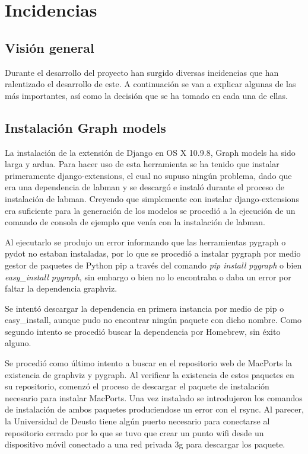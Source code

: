 \chapter{Incidencias}

\section{Visión general}

Durante el desarrollo del proyecto han surgido diversas incidencias que han ralentizado el desarrollo de este. A continuación se van a explicar algunas de las más importantes, así como la decisión que se ha tomado en cada una de ellas.

\section{Instalación Graph models}

La instalación de la extensión de Django en OS X 10.9.8, Graph models ha sido larga y ardua. Para hacer uso de esta herramienta se ha tenido que instalar primeramente django-extensions, el cual no supuso ningún problema, dado que era una dependencia de \acrshort{labman} y se descargó e instaló durante el proceso de instalación de \acrshort{labman}. Creyendo que simplemente con instalar django-extensions era suficiente para la generación de los modelos se procedió a la ejecución de un comando de consola de ejemplo que venía con la instalación de \acrshort{labman}.

Al ejecutarlo se produjo un error informando que las herramientas pygraph o pydot no estaban instaladas, por lo que se procedió a instalar pygraph por medio gestor de paquetes de Python pip\cite{pip} a través del comando \textit{pip install pygraph} o bien \textit{easy\_install pygraph}, sin embargo o bien no lo encontraba o daba un error por faltar la dependencia graphviz.

Se intentó descargar la dependencia en primera instancia por medio de pip o easy\_install, aunque pudo no encontrar ningún paquete con dicho nombre. Como segundo intento se procedió buscar la dependencia por Homebrew\cite{Homebrew}, sin éxito alguno.

Se procedió como último intento a buscar en el repositorio web de MacPorts\cite{MacPorts} la existencia de graphviz y pygraph. Al verificar la existencia de estos paquetes en su repositorio, comenzó el proceso de descargar el paquete de instalación necesario para instalar MacPorts. Una vez instalado se introdujeron los comandos de instalación de ambos paquetes produciendose un error con el rsync. Al parecer, la Universidad de Deusto tiene algún puerto necesario para conectarse al repositorio cerrado por lo que se tuvo que crear un punto \acrshort{wifi} desde un dispositivo móvil conectado a una red privada \acrshort{3g} para descargar los paquete.

